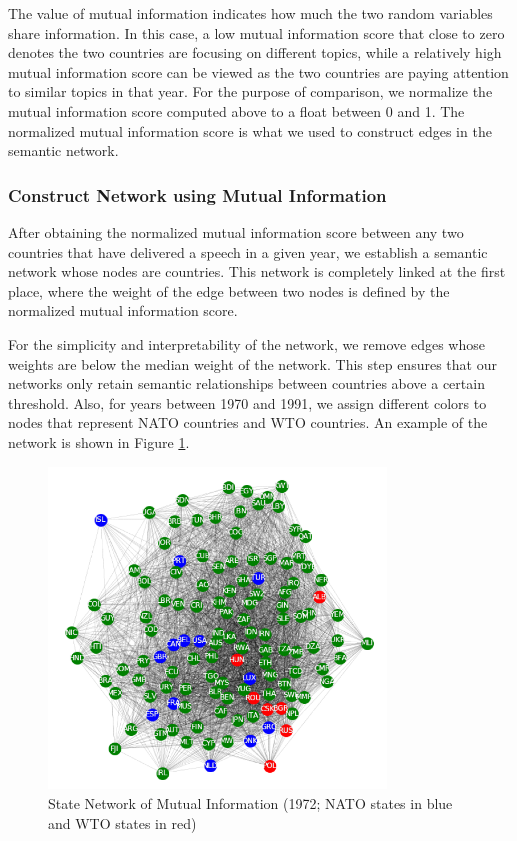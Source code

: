 \documentclass[final,authoryear,3p,12pt,times,hidelinks]{elsarticle}
\begin{document}
The value of mutual information indicates how much the two random variables share information. In this case, a low mutual information score that close to zero denotes the two countries are focusing on different topics, while a relatively high mutual information score can be viewed as the two countries are paying attention to similar topics in that year. For the purpose of comparison, we normalize the mutual information score computed above to a float between 0 and 1. The normalized mutual information score is what we used to construct edges in the semantic network. 

\subsubsection{Construct Network using Mutual Information}
\label{suc:network MI}
After obtaining the normalized mutual information score between any two countries that have delivered a speech in a given year, we establish a semantic network whose nodes are countries. This network is completely linked at the first place, where the weight of the edge between two nodes is defined by the normalized mutual information score. 

For the simplicity and interpretability of the network, we remove edges whose weights are below the median weight of the network. This step ensures that our networks only retain semantic relationships between countries above a certain threshold. Also, for years between 1970 and 1991, we assign different colors to nodes that represent NATO countries and WTO countries. An example of the network is shown in Figure \ref{fig:network MI 1972}. 

\begin{figure}[ht!]
  \begin{center}
    \includegraphics[width=0.8\textwidth]{graphs/1972_mutual_info_network.png}
    \caption{State Network of Mutual Information (1972; NATO states in blue and WTO states in red)}
    \label{fig:network MI 1972}
  \end{center}
\end{figure}
\end{document}

